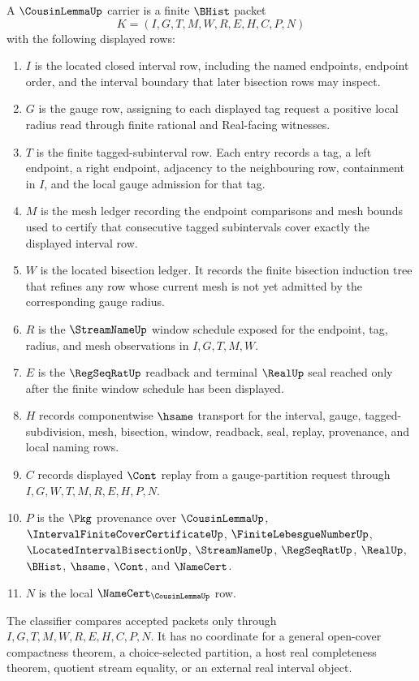 \begin{definition}
\label{def:cousin-lemma-carrier}
A $\CousinLemmaUp$ carrier is a finite $\BHist$ packet
$$
K=(I,G,T,M,W,R,E,H,C,P,N)
$$
with the following displayed rows:
\begin{enumerate}
\item $I$ is the located closed interval row, including the named endpoints, endpoint order, and the interval boundary that later bisection rows may inspect.
\item $G$ is the gauge row, assigning to each displayed tag request a positive local radius read through finite rational and Real-facing witnesses.
\item $T$ is the finite tagged-subinterval row. Each entry records a tag, a left endpoint, a right endpoint, adjacency to the neighbouring row, containment in $I$, and the local gauge admission for that tag.
\item $M$ is the mesh ledger recording the endpoint comparisons and mesh bounds used to certify that consecutive tagged subintervals cover exactly the displayed interval row.
\item $W$ is the located bisection ledger. It records the finite bisection induction tree that refines any row whose current mesh is not yet admitted by the corresponding gauge radius.
\item $R$ is the $\StreamNameUp$ window schedule exposed for the endpoint, tag, radius, and mesh observations in $I,G,T,M,W$.
\item $E$ is the $\RegSeqRatUp$ readback and terminal $\RealUp$ seal reached only after the finite window schedule has been displayed.
\item $H$ records componentwise $\hsame$ transport for the interval, gauge, tagged-subdivision, mesh, bisection, window, readback, seal, replay, provenance, and local naming rows.
\item $C$ records displayed $\Cont$ replay from a gauge-partition request through $I,G,W,T,M,R,E,H,P,N$.
\item $P$ is the $\Pkg$ provenance over $\CousinLemmaUp$, $\IntervalFiniteCoverCertificateUp$, $\FiniteLebesgueNumberUp$, $\LocatedIntervalBisectionUp$, $\StreamNameUp$, $\RegSeqRatUp$, $\RealUp$, $\BHist$, $\hsame$, $\Cont$, and $\NameCert$.
\item $N$ is the local $\NameCert_{\CousinLemmaUp}$ row.
\end{enumerate}
The classifier compares accepted packets only through $I,G,T,M,W,R,E,H,C,P,N$. It has no coordinate for a general open-cover compactness theorem, a choice-selected partition, a host real completeness theorem, quotient stream equality, or an external real interval object.
\end{definition}

